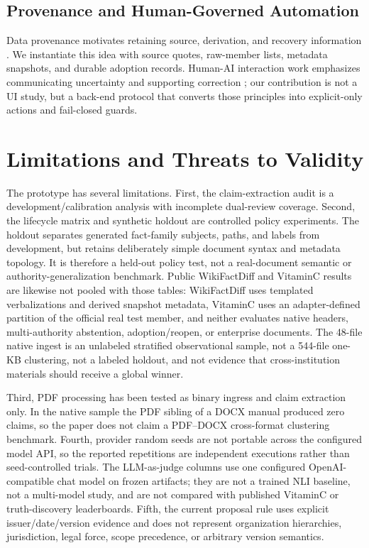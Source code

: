 \documentclass[conference]{IEEEtran}
\begin{document}
\subsection{Provenance and Human-Governed Automation}

Data provenance motivates retaining source, derivation, and recovery information \cite{buneman2001whywhere}. We instantiate this idea with source quotes, raw-member lists, metadata snapshots, and durable adoption records. Human-AI interaction work emphasizes communicating uncertainty and supporting correction \cite{amershi2019guidelines}; our contribution is not a UI study, but a back-end protocol that converts those principles into explicit-only actions and fail-closed guards.

\section{Limitations and Threats to Validity}
\label{sec:limitations}

The prototype has several limitations. First, the claim-extraction audit is a development/calibration analysis with incomplete dual-review coverage. Second, the lifecycle matrix and synthetic holdout are controlled policy experiments. The holdout separates generated fact-family subjects, paths, and labels from development, but retains deliberately simple document syntax and metadata topology. It is therefore a held-out policy test, not a real-document semantic or authority-generalization benchmark. Public WikiFactDiff and VitaminC results are likewise not pooled with those tables: WikiFactDiff uses templated verbalizations and derived snapshot metadata, VitaminC uses an adapter-defined partition of the official real test member, and neither evaluates native headers, multi-authority abstention, adoption/reopen, or enterprise documents. The 48-file native ingest is an unlabeled stratified observational sample, not a 544-file one-KB clustering, not a labeled holdout, and not evidence that cross-institution materials should receive a global winner.

Third, PDF processing has been tested as binary ingress and claim extraction only. In the native sample the PDF sibling of a DOCX manual produced zero claims, so the paper does not claim a PDF--DOCX cross-format clustering benchmark. Fourth, provider random seeds are not portable across the configured model API, so the reported repetitions are independent executions rather than seed-controlled trials. The LLM-as-judge columns use one configured OpenAI-compatible chat model on frozen artifacts; they are not a trained NLI baseline, not a multi-model study, and are not compared with published VitaminC or truth-discovery leaderboards. Fifth, the current proposal rule uses explicit issuer/date/version evidence and does not represent organization hierarchies, jurisdiction, legal force, scope precedence, or arbitrary version semantics.
\end{document}
